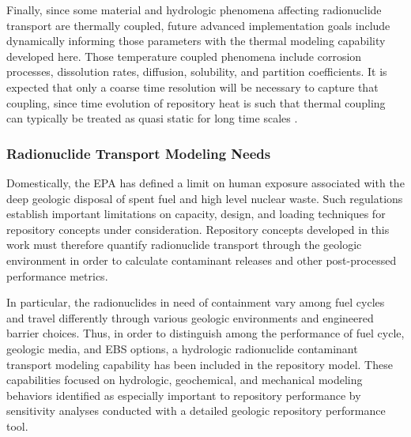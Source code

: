 Finally, since some material and hydrologic phenomena affecting radionuclide 
transport are thermally coupled, future advanced implementation goals include 
dynamically informing those parameters with the thermal modeling capability 
developed here. Those temperature coupled phenomena include corrosion processes, 
dissolution rates, diffusion, solubility, and partition coefficients.  It is 
expected that only a coarse time resolution will be necessary to capture that 
coupling, since time evolution of repository heat is such that thermal coupling 
can typically be treated as quasi static for long time scales 
\cite{andra_argile:_2005}.  




\subsubsection{Radionuclide Transport Modeling Needs}

Domestically, the \gls{EPA} has defined a limit on  human 
exposure associated with the deep geologic disposal of spent fuel and high 
level nuclear waste. Such regulations establish important limitations on 
capacity, design, and loading techniques for repository concepts under 
consideration. Repository concepts developed in this work must therefore 
quantify radionuclide transport through the geologic environment in order to 
calculate contaminant releases and other post-processed performance metrics. 

In particular, the radionuclides in need of containment vary among fuel cycles 
and travel differently through various geologic environments and engineered 
barrier choices. Thus, in order to distinguish among the performance of fuel 
cycle, geologic media, and \gls{EBS} options, a hydrologic radionuclide 
contaminant transport modeling capability has been included in the repository 
model.  These capabilities focused on hydrologic, geochemical, and 
mechanical modeling behaviors identified as especially important to repository 
performance by sensitivity analyses conducted with a detailed geologic 
repository performance tool.  

